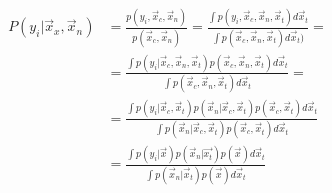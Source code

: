 	\begin{align*}
		P(y_i|\vec{x}_x, \vec{x}_n) &=\frac{p(y_i, \vec{x}_c, \vec{x}_n)}{p(\vec{x}_c, \vec{x}_n)} = \frac{\int p(y_i, \vec{x}_c, \vec{x}_n, \vec{x}_t)d\vec{x}_t}{\int p(\vec{x}_c, \vec{x}_n, \vec{x}_t)d\vec{x}_t)}=\\
																&=\frac{\int p(y_i|\vec{x}_c, \vec{x}_n, \vec{x}_t)p(\vec{x}_c, \vec{x}_n, \vec{x}_t)d\vec{x}_t}{\int p(\vec{x}_c, \vec{x}_n, \vec{x}_t)d\vec{x}_t}=\\
																&=\frac{\int p(y_i|\vec{x}_c, \vec{x}_t)p(\vec{x}_n|\vec{x}_c, \vec{x}_t)p(\vec{x}_c, \vec{x}_t)d\vec{x}_t}{\int p(\vec{x}_n|\vec{x}_c, \vec{x}_t)p(\vec{x}_c, \vec{x}_t)d\vec{x}_t}\\
																&=\frac{\int p(y_i|\vec{x})p(\vec{x}_n|\vec{x_t})p(\vec{x})d\vec{x}_t}{\int p(\vec{x}_n|\vec{x}_t)p(\vec{x})d\vec{x}_t}
	\end{align*}
